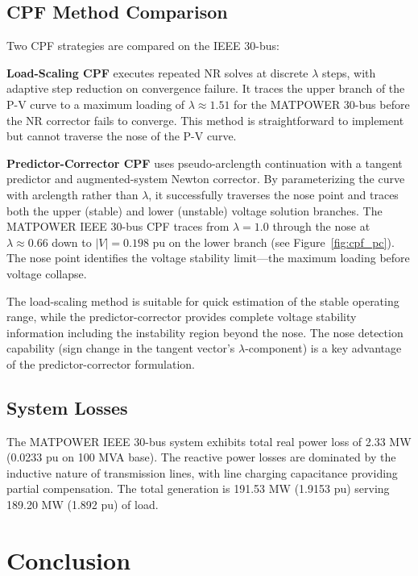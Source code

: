 \documentclass[12pt,a4paper]{article}
\begin{document}
\subsection{CPF Method Comparison}

Two CPF strategies are compared on the IEEE 30-bus:

\textbf{Load-Scaling CPF} executes repeated NR solves at discrete $\lambda$ steps, with adaptive step reduction on convergence failure. It traces the upper branch of the P-V curve to a maximum loading of $\lambda \approx 1.51$ for the MATPOWER 30-bus before the NR corrector fails to converge. This method is straightforward to implement but cannot traverse the nose of the P-V curve.

\textbf{Predictor-Corrector CPF} uses pseudo-arclength continuation with a tangent predictor and augmented-system Newton corrector. By parameterizing the curve with arclength rather than $\lambda$, it successfully traverses the nose point and traces both the upper (stable) and lower (unstable) voltage solution branches. The MATPOWER IEEE 30-bus CPF traces from $\lambda = 1.0$ through the nose at $\lambda \approx 0.66$ down to $|V| = 0.198$ pu on the lower branch (see Figure~\ref{fig:cpf_pc}). The nose point identifies the voltage stability limit—the maximum loading before voltage collapse.

The load-scaling method is suitable for quick estimation of the stable operating range, while the predictor-corrector provides complete voltage stability information including the instability region beyond the nose. The nose detection capability (sign change in the tangent vector's $\lambda$-component) is a key advantage of the predictor-corrector formulation.

\subsection{System Losses}

The MATPOWER IEEE 30-bus system exhibits total real power loss of 2.33 MW (0.0233 pu on 100 MVA base). The reactive power losses are dominated by the inductive nature of transmission lines, with line charging capacitance providing partial compensation. The total generation is 191.53 MW (1.9153 pu) serving 189.20 MW (1.892 pu) of load.

\section{Conclusion}
\end{document}
